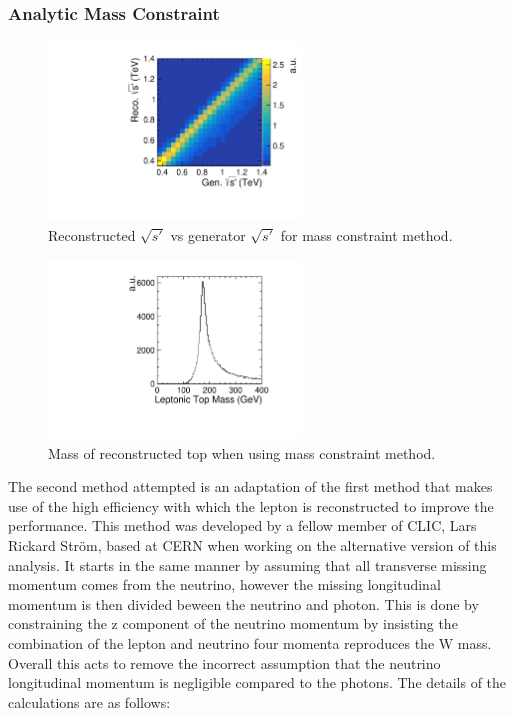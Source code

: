 \subsubsection{Analytic Mass Constraint}

\begin{figure}
  \centering
  \includegraphics[width=0.6\textwidth]{TopAnalysis/figures/AnalEVsTrueE.pdf}
  \caption[Reconstructed $\sqrt{s'}$ vs generator $\sqrt{s'}$ for mass constraint method]{Reconstructed $\sqrt{s'}$ vs generator $\sqrt{s'}$ for mass constraint method.}
  \label{fig:MassConstraint}
\end{figure}
\begin{figure}
  \centering
  \includegraphics[width=0.6\textwidth]{TopAnalysis/figures/AnalTopMass.pdf}
  \caption[Mass of reconstructed leptonic top when using mass constraint method]{Mass of reconstructed top when using mass constraint method.}
  \label{fig:TopMassFrommassMethod}
\end{figure}

The second method attempted is an adaptation of the first method that makes use of the high efficiency with which the lepton is reconstructed to improve the performance. This method was developed by a fellow member of \ac{CLIC}, Lars Rickard Str{\"o}m, based at \ac{CERN} when working on the alternative version of this analysis. It starts in the same manner by assuming that all transverse missing momentum comes from the neutrino, however the missing longitudinal momentum is then divided beween the neutrino and photon. This is done by constraining the z component of the neutrino momentum by insisting the combination of the lepton and neutrino four momenta reproduces the W mass. Overall this acts to remove the incorrect assumption that the neutrino longitudinal momentum is negligible compared to the photons. The details of the calculations are as follows:

